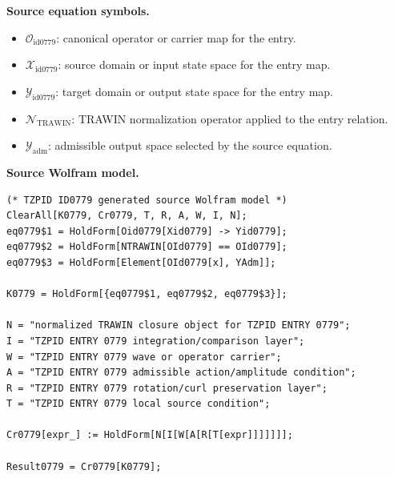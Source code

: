 \begin{minipage}[t]{0.49\linewidth}
\begingroup
\small
\raggedright
\textbf{Source equation symbols.}\par
\begin{itemize}[leftmargin=1.35em,itemsep=1pt,topsep=1pt,parsep=0pt]
    \item $\mathcal{O}_{\mathrm{id0779}}$: canonical operator or carrier map for the entry.
    \item $\mathcal{X}_{\mathrm{id0779}}$: source domain or input state space for the entry map.
    \item $\mathcal{Y}_{\mathrm{id0779}}$: target domain or output state space for the entry map.
    \item $\mathcal{N}_{\mathrm{TRAWIN}}$: TRAWIN normalization operator applied to the entry relation.
    \item $\mathcal{Y}_{\mathrm{adm}}$: admissible output space selected by the source equation.
\end{itemize}
\endgroup
\end{minipage}\hfill
\begin{minipage}[t]{0.47\linewidth}
\begingroup
\scriptsize
\raggedright
\textbf{Source Wolfram model.}\par
\begin{Verbatim}[fontsize=\tiny,breaklines=true,breakanywhere=true]
(* TZPID ID0779 generated source Wolfram model *)
ClearAll[K0779, Cr0779, T, R, A, W, I, N];
eq0779$1 = HoldForm[Oid0779[Xid0779] -> Yid0779];
eq0779$2 = HoldForm[NTRAWIN[OId0779] == OId0779];
eq0779$3 = HoldForm[Element[OId0779[x], YAdm]];

K0779 = HoldForm[{eq0779$1, eq0779$2, eq0779$3}];

N = "normalized TRAWIN closure object for TZPID ENTRY 0779";
I = "TZPID ENTRY 0779 integration/comparison layer";
W = "TZPID ENTRY 0779 wave or operator carrier";
A = "TZPID ENTRY 0779 admissible action/amplitude condition";
R = "TZPID ENTRY 0779 rotation/curl preservation layer";
T = "TZPID ENTRY 0779 local source condition";

Cr0779[expr_] := HoldForm[N[I[W[A[R[T[expr]]]]]]];

Result0779 = Cr0779[K0779];
\end{Verbatim}
\endgroup
\end{minipage}

